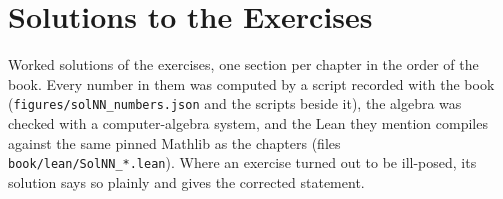 \chapter{Solutions to the Exercises}\label{appC}

Worked solutions of the exercises, one section per chapter in the order of the book. Every number in them was computed
by a script recorded with the book (\texttt{figures/solNN\_numbers.json} and the scripts beside it), the algebra was
checked with a computer-algebra system, and the Lean they mention compiles against the same pinned Mathlib as the
chapters (files \texttt{book/lean/SolNN\_*.lean}). Where an exercise turned out to be ill-posed, its solution says so
plainly and gives the corrected statement.

